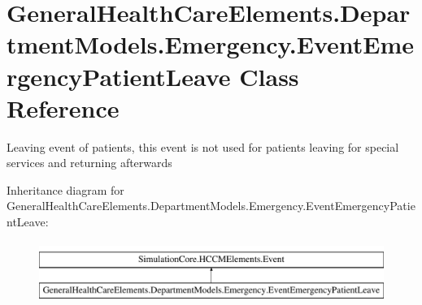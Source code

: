 \hypertarget{class_general_health_care_elements_1_1_department_models_1_1_emergency_1_1_event_emergency_patient_leave}{}\section{General\+Health\+Care\+Elements.\+Department\+Models.\+Emergency.\+Event\+Emergency\+Patient\+Leave Class Reference}
\label{class_general_health_care_elements_1_1_department_models_1_1_emergency_1_1_event_emergency_patient_leave}


Leaving event of patients, this event is not used for patients leaving for special services and returning afterwards  


Inheritance diagram for General\+Health\+Care\+Elements.\+Department\+Models.\+Emergency.\+Event\+Emergency\+Patient\+Leave\+:\begin{figure}[H]
\begin{center}
\leavevmode
\includegraphics[height=2.000000cm]{class_general_health_care_elements_1_1_department_models_1_1_emergency_1_1_event_emergency_patient_leave}
\end{center}
\end{figure}
